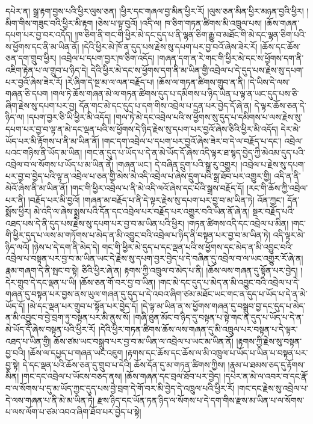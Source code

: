 དཔེར་ན། སྒྲ་རྟག་བྱས་པའི་ཕྱིར་ལུས་ཅན། །ཕྱིར་དང་གཞལ་བྱ་མིན་ཕྱིར་རོ། །ལུས་ཅན་མིན་ཕྱིར་མཉན་བྱའི་ཕྱིར། །མིག་གིས་གཟུང་བའི་ཕྱིར་མི་རྟག །ཅེས་པ་ལྟ་བུའོ། །འདི་ལ། ཁ་ཅིག་གཏན་ཚིགས་མི་འཁྲུལ་པས། །ཆོས་གཞན་དཔག་པར་བྱ་བར་འདོད། །ཁ་ཅིག་ནི་གང་གི་ཕྱིར་མེ་དང་དུད་པ་ནི་ལྷན་ཅིག་རྒྱུ་བ་མཐོང་གི་མེ་དང་ལྷན་ཅིག་པའི་ས་ཕྱོགས་དང་ནི་མ་ཡིན་ནོ། །དེའི་ཕྱིར་མེ་ཁོ་ན་དུད་པས་རྗེས་སུ་དཔག་པར་བྱ་བའོ་ཞེས་ཟེར་རོ། །ཆོས་དང་ཆོས་ཅན་དག་གྲུབ་ཕྱིར། །འབྲེལ་པ་དཔག་བྱར་ཁ་ཅིག་འདོད། །གཞན་དག་ན་རེ་གང་གི་ཕྱིར་མེ་དང་ས་ཕྱོགས་དག་ནི་འཇིག་རྟེན་པ་ལ་གྲུབ་པ་ཉིད་དེ། དེའི་ཕྱིར་མེ་དང་ས་ཕྱོགས་དག་ནི་མ་ཡིན་གྱི་འབྲེལ་པ་དེ་དུད་པས་རྗེས་སུ་དཔག་པར་བྱའོ་ཞེས་ཟེར་རོ། །རེ་ཞིག་དེ་སྔ་མ་ལ་ལན་བརྗོད་པ། །ཆོས་ལ་གཏན་ཚིགས་གྲུབ་ན་ནི། །དེ་ཡིས་དེ་ལས་གཞན་ཅི་དཔག །གལ་ཏེ་ཆོས་གཞན་མེ་ལ་གཏན་ཚིགས་དུད་པ་དམིགས་པ་ཉིད་ཡིན་པ་ལྟ་ན་ཡང་དུད་པས་ཅི་ཞིག་རྗེས་སུ་དཔག་པར་བྱ། དོན་གང་མེ་དང་དུད་པ་དག་གིས་འབྲེལ་པ་དྲན་པར་བྱེད་དོ་ཞེ་ན། དེ་ལྟར་ཆོས་ཅན་དེ་ཉིད་ལ། །དཔག་བྱར་ཅི་ཡི་ཕྱིར་མི་འདོད། །གལ་ཏེ་མེ་དང་འབྲེལ་པའི་ས་ཕྱོགས་སུ་དུད་པ་དམིགས་པ་ལས་རྗེས་སུ་དཔག་པར་བྱ་བ་ལྟ་ན་མེ་དང་ལྡན་པའི་ས་ཕྱོགས་དེ་ཉིད་རྗེས་སུ་དཔག་པར་བྱའོ་ཞེས་ཅིའི་ཕྱིར་མི་འདོད། དེར་མེ་ཡོད་པར་མི་རྟོགས་པ་ནི་མ་ཡིན་ནོ། །གང་དག་འབྲེལ་པ་དཔག་པར་བྱའོ་ཞེས་ཟེར་བ་དེ་ལ་བརྗོད་པ་དང་། འབྲེལ་པའང་གཉིས་ནི་ཡོད་མ་ཡིན། །གང་ན་དུད་པ་ཡོད་པ་དེ་ན་མེ་ཡོད་དོ་ཞེས་འདི་ལྟར་ཐ་སྙད་བྱེད་ཀྱི་མེའམ་དུད་པའི་འབྲེལ་བ་ལ་སོགས་པ་ཡོད་པ་མ་ཡིན་ནོ། །གཞན་ཡང་། དེ་བཞིན་དྲུག་པའི་སྒྲ་རུ་འགྱུར། །འབྲེལ་པ་རྗེས་སུ་དཔག་པར་བྱ་བ་བྱེད་པའི་ལྟ་ན་འབྲེལ་པ་ཅན་གྱི་མེས་མེ་འདི་འབྲེལ་པ་ཞེས་དྲུག་པའི་སྒྲ་ཐོབ་པར་འགྱུར་གྱི། འདི་ན་ནི་མེའོ་ཞེས་ནི་མ་ཡིན་ནོ། །གང་གི་ཕྱིར་འབྲེལ་པ་ནི་མེ་འདི་ལའོ་ཞེས་དང་པོའི་སྒྲས་བརྗོད་དོ། །རང་གི་ཆོས་ཀྱི་འབྲེལ་པར་ནི། །བརྗོད་པར་མི་བྱའོ། །གཞན་མ་བརྗོད་པ་ནི་དེ་ལྟར་རྗེས་སུ་དཔག་པར་བྱ་བ་མ་ཡིན་ཏེ། འོན་ཀྱང་། དོན་སྨོས་ཕྱིར། མེ་འདི་ལ་ཞེས་སྨྲས་པའི་དོན་དང་འབྲེལ་པར་བརྗོད་པར་འགྱུར་བའི་ཡིན་ནོ་ཞེ་ན། སྔར་བརྗོད་པའི་འཐད་པས་དེ་ནི་དུད་པས་རྗེས་སུ་དཔག་པར་བྱ་བ་མ་ཡིན་པའི་ཕྱིར། །གཏན་ཚིགས་འདི་དང་འབྲེལ་པ་མིན། །གང་གི་ཕྱིར་དུད་པ་ལས་མ་གཏོགས་པ་མེད་ན་མི་འབྱུང་བའི་འབྲེལ་པ་ཉིད་ནི་བསྟན་པར་བྱ་བ་མ་ཡིན་ཏེ། འདི་ལྟར་མེ་ཉིད་ལའོ། །ཉེས་པ་དེ་དག་ནི་མེད་དེ། གང་གི་ཕྱིར་མེ་དུད་པ་དང་ལྡན་པའི་ས་ཕྱོགས་དང་མེད་ན་མི་འབྱུང་བའི་འབྲེལ་པ་བསྟན་པར་བྱ་བ་མ་ཡིན་ཡང་དེ་རྗེས་སུ་དཔག་བྱར་བྱེད་པ་དེ་བཞིན་དུ་འབྲེལ་བ་ལ་ཡང་འགྱུར་རོ་ཞེ་ན། རྣམ་གཞག་དེ་ནི་སྤང་བ་སྟེ། ཅིའི་ཕྱིར་ཞེ་ན། རྟགས་ཀྱི་འཁྲུལ་བ་མེད་པ་ནི། །ཆོས་ལས་གཞན་དུ་སྟོན་པར་བྱེད། །དེར་གྲུབ་དེ་དང་ལྡན་པ་ཡི། །ཆོས་ཅན་གོ་བར་བྱ་བ་ཡིན། །གང་མེ་དང་དུད་པ་མེད་ན་མི་འབྱུང་བའི་འབྲེལ་པ་དེ་གཞན་དུ་བསྟན་པར་བྱས་ནས་ཡུལ་གཞན་དུ་དུད་པ་དེ་འབའ་ཞིག་ཙམ་མཐོང་ཡང་གང་ན་དུད་པ་ཡོད་པ་དེ་ན་མེ་ཡོད་དོ། །མེ་དང་ལྡན་པར་གྲུབ་པ་སྟོན་པར་བྱེད་དོ། །དེ་ལྟ་མ་ཡིན་ན་ས་ཕྱོགས་གཞན་དུ་བསྒྲུབ་བྱ་དང་དུད་པ་མེད་ན་མི་འབྱུང་བ་བྱེ་བྲག་ཏུ་བསྟན་པར་མི་ནུས་སོ། །གཞི་ཐུན་མོང་བ་ཉིད་དུ་བསྟན་པ་སྟེ་གང་ན་དུད་པ་ཡོད་པ་དེ་ན་མེ་ཡོད་དོ་ཞེས་བསྟན་པའི་ཕྱིར་རོ། །དེའི་ཕྱིར་གཏན་ཚིགས་ཆོས་ལས་གཞན་དུ་མི་འཁྲུལ་པར་བསྟན་པ་དེ་ལྟར་འཐད་པ་ཡིན་གྱི། ཆོས་ཙམ་ཡང་བསྒྲུབ་པར་བྱ་བ་མ་ཡིན་ལ་འབྲེལ་པ་ཡང་མ་ཡིན་ནོ། །རྟགས་ཀྱི་རྗེས་སུ་བསྟན་བྱ་བའི། །ཆོས་ལ་དཔྱད་པ་གཞན་ཡང་འཇུག །རྟགས་དང་ཆོས་དང་ཆོས་ལ་མི་འཁྲུལ་པ་ཡོད་པ་ཡིན་པ་བསྟན་པར་བྱ་སྟེ། དེ་དང་ལྡན་པའི་ཆོས་ཅན་དུ་གྲུབ་པ་དེའི། ཆོས་དོན་དུ་མ་གཏན་ཚིགས་ཀྱིས། །རྣམ་པ་ཐམས་ཅད་དུ་རྟོགས་མིན། །གང་དང་འབྲེལ་པ་ཡོངས་བཅད་ནས། །ཆོས་གཞན་དང་བྲལ་ཐོབ་པར་བྱེད། །དཔེར་ན་མེ་ལ་འབར་བ་དང་རྣོ་བ་ལ་སོགས་པ་དུ་མ་ཡོད་ཀྱང་དུད་པས་བྱེ་བྲག་དེ་གོ་བར་མི་བྱེད་དེ་འཁྲུལ་པའི་ཕྱིར་རོ། །གང་དང་རྗེས་སུ་འབྲེལ་པ་དེ་ལས་གཞན་པ་ནི་མེ་མ་ཡིན་ཏེ། རྫས་ཉིད་དང་ཡོན་ཏན་ཉིད་ལ་སོགས་པ་དེ་དག་གིས་རྫས་མ་ཡིན་པ་ལ་སོགས་པ་ལས་ལོག་པ་ཙམ་འབའ་ཞིག་ཐོབ་པར་བྱེད་པ་སྟེ། 